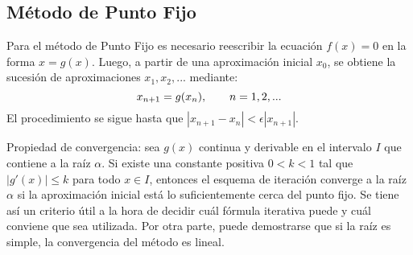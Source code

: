 \documentclass[11pt]{article}
\begin{document}
\begin{itemize}
\end{itemize}

\subsection*{ M\'etodo de Punto Fijo}

Para el m\'etodo de Punto Fijo es necesario reescribir la ecuaci\'on $f(x) = 0$ en la forma $x = g(x)$. Luego, a partir de una aproximaci\'on inicial $x_{0}$, se obtiene la sucesi\'on de aproximaciones $x_{1}, x_{2}, ... $ mediante:
\begin{equation*} 
\centering
x_{n+1} = g(x_{n}), \qquad n= 1, 2, ...  
\end{equation*}
El procedimiento se sigue hasta que $|x_{n+1} - x_{n}| < \epsilon|x_{n+1}|$. \par
Propiedad de convergencia: sea $g(x)$ continua y derivable en el intervalo $I$ que contiene a la ra\'iz $\alpha$. Si existe una constante positiva $0<k<1$ tal que $|g'(x)| \leq k$ para todo $x \in I$, entonces el esquema de iteraci\'on converge a la ra\'iz $\alpha$ si la aproximaci\'on inicial est\'a lo suficientemente cerca del punto fijo. Se tiene as\'i un criterio \'util a la hora de decidir cu\'al f\'ormula iterativa puede y cu\'al conviene que sea utilizada. Por otra parte, puede demostrarse que si la ra\'iz es simple, la convergencia del m\'etodo es lineal.
\end{document}
